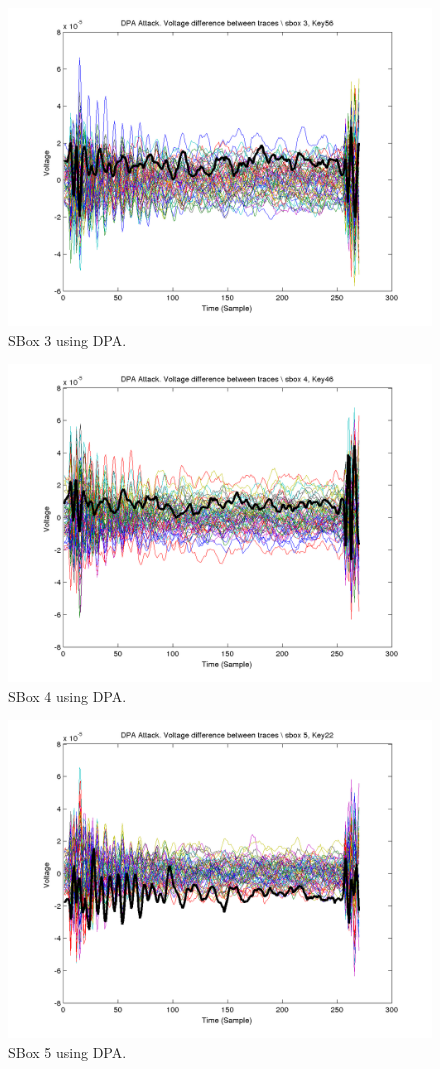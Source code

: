   \begin{figure}[]
  \includegraphics[width=0.9\linewidth]{./dpa3}
  \caption{SBox 3 using DPA.}
  \label{fig:dpa3}
  \end{figure}
  
  \begin{figure}[]
  \includegraphics[width=0.9\linewidth]{./dpa4}
  \caption{SBox 4 using DPA.}
  \label{fig:dpa4}
  \end{figure}
  
  \begin{figure}[]
  \includegraphics[width=0.9\linewidth]{./dpa5}
  \caption{SBox 5 using DPA.}
  \label{fig:dpa5}
  \end{figure}
  
